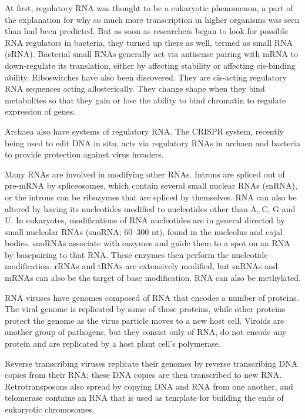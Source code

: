 At first, regulatory RNA was thought to be a eukaryotic phenomenon, a part of the explanation for why so much more transcription in higher organisms was seen than had been predicted. But as soon as researchers began to look for possible RNA regulators in bacteria, they turned up there as well, termed as small RNA (sRNA). Bacterial small RNAs generally act via antisense pairing with mRNA to down-regulate its translation, either by affecting stability or affecting cis-binding ability. Riboswitches have also been discovered. They are cis-acting regulatory RNA sequences acting allosterically. They change shape when they bind metabolites so that they gain or lose the ability to bind chromatin to regulate expression of genes.

Archaea also have systems of regulatory RNA. The CRISPR system, recently being used to edit DNA in situ, acts via regulatory RNAs in archaea and bacteria to provide protection against virus invaders.

Many RNAs are involved in modifying other RNAs. Introns are spliced out of pre-mRNA by spliceosomes, which contain several small nuclear RNAs (snRNA), or the introns can be ribozymes that are spliced by themselves. RNA can also be altered by having its nucleotides modified to nucleotides other than A, C, G and U. In eukaryotes, modifications of RNA nucleotides are in general directed by small nucleolar RNAs (snoRNA; 60--300 nt), found in the nucleolus and cajal bodies. snoRNAs associate with enzymes and guide them to a spot on an RNA by basepairing to that RNA. These enzymes then perform the nucleotide modification. rRNAs and tRNAs are extensively modified, but snRNAs and mRNAs can also be the target of base modification. RNA can also be methylated.

RNA viruses have genomes composed of RNA that encodes a number of proteins. The viral genome is replicated by some of those proteins, while other proteins protect the genome as the virus particle moves to a new host cell. Viroids are another group of pathogens, but they consist only of RNA, do not encode any protein and are replicated by a host plant cell's polymerase.

Reverse transcribing viruses replicate their genomes by reverse transcribing DNA copies from their RNA; these DNA copies are then transcribed to new RNA. Retrotransposons also spread by copying DNA and RNA from one another, and telomerase contains an RNA that is used as template for building the ends of eukaryotic chromosomes.

